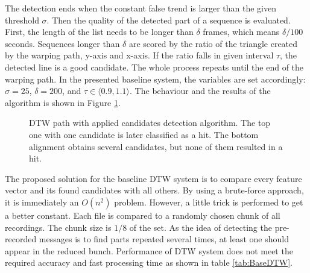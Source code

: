 \documentclass{ExcelAtFIT}
\begin{document}
The detection ends when the constant false trend is larger than the given threshold $\sigma$. Then the quality of the detected part of a sequence is evaluated. First, the length of the list needs to be longer than $\delta$ frames, which means $\delta/100$ seconds. Sequences longer than $\delta$ are scored by the ratio of the triangle created by the warping path, y-axis and x-axis. If the ratio falls in given interval $\tau$, the detected line is a good candidate. The whole process repeats until the end of the warping path. In the presented baseline system, the variables are set accordingly: $\sigma = 25$, $\delta = 200$, and $\tau \in \langle0.9, 1.1\rangle$. The behaviour and the results of the algorithm is shown in Figure \ref{fig:BaseDTW}.

\begin{figure}[hbt]
	\centering
	\caption{DTW path with applied candidates detection algorithm. The top one with one candidate is later classified as a hit. The bottom alignment obtains several candidates, but none of them resulted in a hit.}
    \label{fig:BaseDTW}
\end{figure}


The proposed solution for the baseline DTW system is to compare every feature vector and its found candidates with all others. By using a brute-force approach, it is immediately an $O(n^2)$ problem. However, a little trick is performed to get a better constant. Each file is compared to a randomly chosen chunk of all recordings. The chunk size is $1/8$ of the set. As the idea of detecting the pre-recorded messages is to find parts repeated several times, at least one should appear in the reduced bunch. Performance of DTW system does not meet the required accuracy and fast processing time as shown in table \ref{tab:BaseDTW}.
\end{document}
